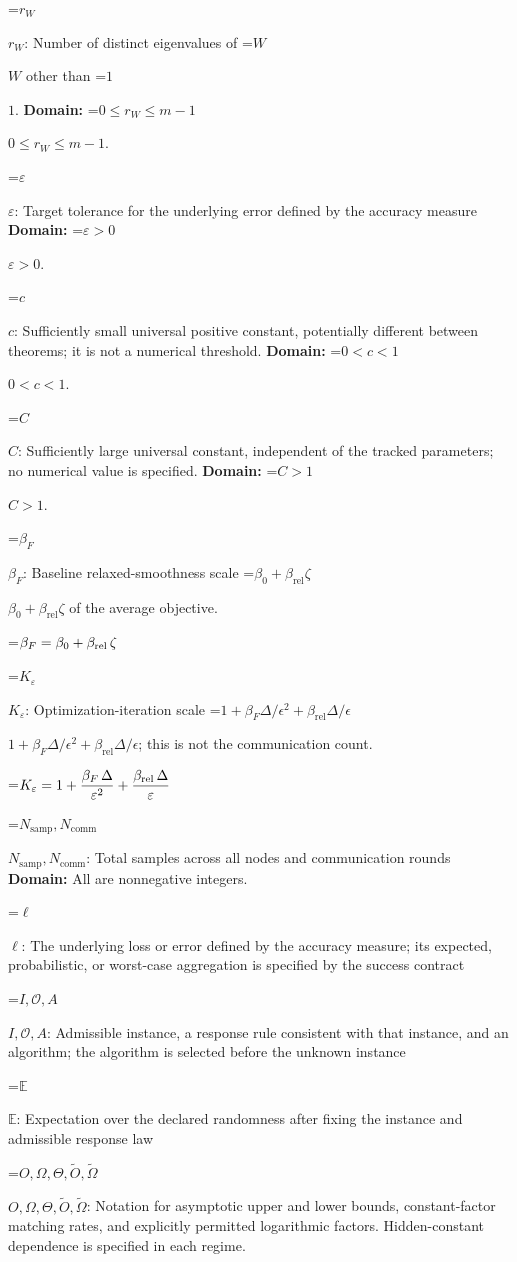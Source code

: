 \documentclass[10pt,a4paper]{article}
\newcommand{\AtlasMath}[1]{\par\begingroup\centering\setbox0=\hbox{$\displaystyle #1$}\ifdim\wd0>1.4\linewidth\typeout{ATLAS WIDE FORMULA: \the\wd0}\fi\ifdim\wd0>\linewidth\resizebox{\linewidth}{!}{\box0}\else\box0\fi\par\endgroup}
\newcommand{\AtlasInlineMath}[1]{\begingroup\setbox0=\hbox{$#1$}\ifdim\wd0>.4\linewidth\endgroup\AtlasMath{#1}\else\endgroup$#1$\fi}
\begin{document}
\AtlasInlineMath{r_W}: Number of distinct eigenvalues of \AtlasInlineMath{W} other than \AtlasInlineMath{1}. \textbf{Domain:} \AtlasInlineMath{0\le r_W\le m-1}.

\AtlasInlineMath{\varepsilon}: Target tolerance for the underlying error defined by the accuracy measure \textbf{Domain:} \AtlasInlineMath{\varepsilon>0}.

\AtlasInlineMath{c}: Sufficiently small universal positive constant, potentially different between theorems; it is not a numerical threshold. \textbf{Domain:} \AtlasInlineMath{0<c<1}.

\AtlasInlineMath{C}: Sufficiently large universal constant, independent of the tracked parameters; no numerical value is specified. \textbf{Domain:} \AtlasInlineMath{C>1}.

\AtlasInlineMath{\beta_F}: Baseline relaxed-smoothness scale \AtlasInlineMath{\beta_0+\beta_{\mathrm{rel}}\zeta} of the average objective.


\AtlasMath{\beta_F=\beta_0+\beta_{\rm rel}\,\zeta}


\AtlasInlineMath{K_\varepsilon}: Optimization-iteration scale \AtlasInlineMath{1+\beta_F\Delta/\epsilon^2+\beta_{\mathrm{rel}}\Delta/\epsilon}; this is not the communication count.


\AtlasMath{K_\varepsilon=1+\frac{\beta_F\,\Delta}{{\varepsilon}^{2}}+\frac{\beta_{\rm rel}\,\Delta}{\varepsilon}}


\AtlasInlineMath{N_{\mathrm{samp}},N_{\mathrm{comm}}}: Total samples across all nodes and communication rounds \textbf{Domain:} All are nonnegative integers.

\AtlasInlineMath{\ell}: The underlying loss or error defined by the accuracy measure; its expected, probabilistic, or worst-case aggregation is specified by the success contract

\AtlasInlineMath{I,\mathcal{O},A}: Admissible instance, a response rule consistent with that instance, and an algorithm; the algorithm is selected before the unknown instance

\AtlasInlineMath{\mathbb{E}}: Expectation over the declared randomness after fixing the instance and admissible response law

\AtlasInlineMath{O,\Omega,\Theta,\widetilde{O},\widetilde\Omega}: Notation for asymptotic upper and lower bounds, constant-factor matching rates, and explicitly permitted logarithmic factors. Hidden-constant dependence is specified in each regime.
\end{document}

